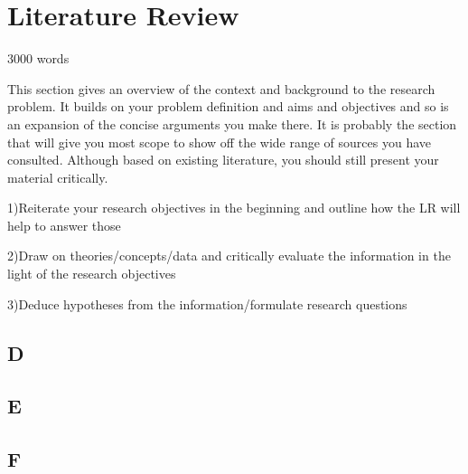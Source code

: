 \chapter{Literature Review}\label{ch:literaturereview}

3000 words

This section gives an overview of the context and background to the research problem.
It builds on your problem definition and aims and objectives and so is an expansion of the concise arguments you make there.
It is probably the section that will give you most scope to show off the wide range of sources you have consulted.
Although based on existing literature, you should still present your material critically.

1)Reiterate your research objectives in the beginning and outline how the LR will help to answer those

2)Draw on theories/concepts/data and critically evaluate the information in the light of the research objectives

3)Deduce hypotheses from the information/formulate research questions


\section{D}\label{sec:D}
\lipsum[1]

\section{E}\label{sec:E}
\lipsum[1]

\section{F}\label{sec:F}
\lipsum[1]